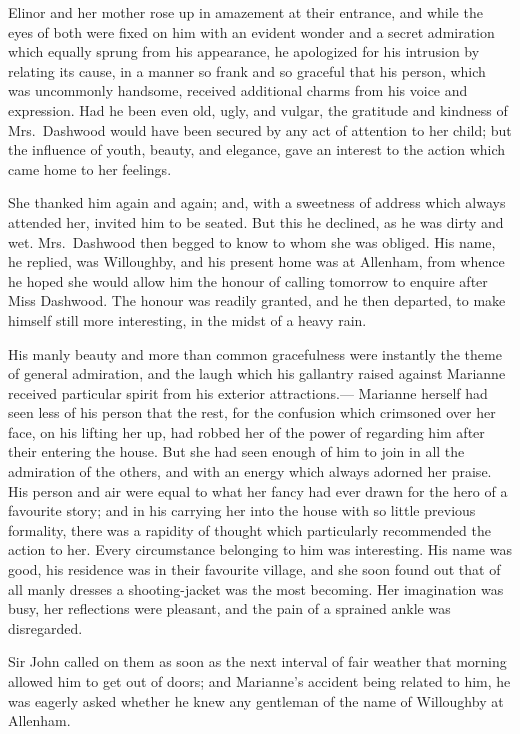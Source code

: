 Elinor and her mother rose up in amazement at
their entrance, and while the eyes of both were fixed
on him with an evident wonder and a secret admiration
which equally sprung from his appearance, he apologized
for his intrusion by relating its cause, in a manner
so frank and so graceful that his person, which was
uncommonly handsome, received additional charms from his voice
and expression.  Had he been even old, ugly, and vulgar,
the gratitude and kindness of Mrs.\ Dashwood would
have been secured by any act of attention to her child;
but the influence of youth, beauty, and elegance,
gave an interest to the action which came home to her feelings.

She thanked him again and again; and, with a sweetness
of address which always attended her, invited him to
be seated.  But this he declined, as he was dirty and wet.
Mrs.\ Dashwood then begged to know to whom she was obliged.
His name, he replied, was Willoughby, and his present
home was at Allenham, from whence he hoped she would
allow him the honour of calling tomorrow to enquire
after Miss Dashwood.  The honour was readily granted,
and he then departed, to make himself still more interesting,
in the midst of a heavy rain.

His manly beauty and more than common gracefulness
were instantly the theme of general admiration,
and the laugh which his gallantry raised against Marianne
received particular spirit from his exterior attractions.---%
Marianne herself had seen less of his person that the rest,
for the confusion which crimsoned over her face, on his
lifting her up, had robbed her of the power of regarding
him after their entering the house.  But she had seen
enough of him to join in all the admiration of the others,
and with an energy which always adorned her praise.
His person and air were equal to what her fancy had ever
drawn for the hero of a favourite story; and in his carrying
her into the house with so little previous formality, there
was a rapidity of thought which particularly recommended
the action to her.  Every circumstance belonging to him
was interesting.  His name was good, his residence was in
their favourite village, and she soon found out that of all
manly dresses a shooting-jacket was the most becoming.
Her imagination was busy, her reflections were pleasant,
and the pain of a sprained ankle was disregarded.

Sir John called on them as soon as the next interval
of fair weather that morning allowed him to get out
of doors; and Marianne's accident being related to him,
he was eagerly asked whether he knew any gentleman
of the name of Willoughby at Allenham.

